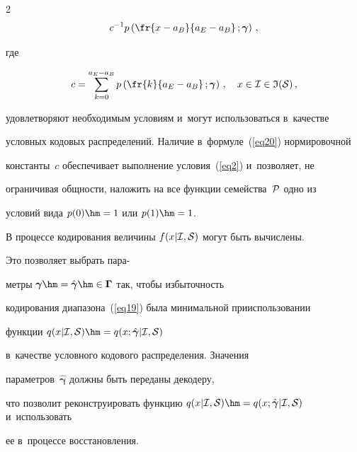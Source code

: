\begin{multicols}{2}
\begin{equation}
c^{-1}p\left( \fr{x-a_B}{a_E-a_B}\,;\boldsymbol{\gamma}\right)\,,

\label{eq20}

\end{equation}

где

$$

c=\sum\limits_{k=0}^{a_E-a_B} p\left( \fr{k}{a_E-a_B}\,;\boldsymbol{\gamma}\right)\,,

\quad x\in{\cal I}\in{\frak I}({\cal S})\,,

$$

удовлетворяют необходимым условиям и~могут использоваться в~качестве 

условных кодовых распределений. Наличие в~формуле~(\ref{eq20}) нормировочной 

константы~$c$ обеспечивает выполнение условия~(\ref{eq2}) и~позволяет, не 

ограничивая общности, наложить на все функции семейства~${\cal P}$ одно из 

условий вида $p(0)\hm=1$ или $p(1)\hm=1$.



В процессе кодирования величины $f(x|{\cal I},{\cal S})$ могут быть вычислены. 

Это позволяет выбрать пара-\linebreak\vspace*{-12pt}



\pagebreak



\noindent

метры $\boldsymbol{\gamma}\hm=

\hat{\boldsymbol{\gamma}}\hm\in\boldsymbol{\Gamma}$ так, чтобы избыточность 

кодирования диапазона~(\ref{eq19}) была минимальной при\linebreak использовании 

функции $q(x|{\cal I},{\cal S}) \hm= q(x;\hat{\boldsymbol{\gamma}}|{\cal I},{\cal S})$ 

в~качестве условного кодового распределения. Значения 

параметров~$\hat{\boldsymbol{\gamma}}$ должны быть переданы декодеру, 

что позволит реконструировать функцию  $q(x|{\cal I},{\cal S}) \hm= 

q(x;\hat{\boldsymbol{\gamma}}|{\cal I},{\cal S})$ и~использовать 

ее в~процессе восстановления.




\end{multicols}
